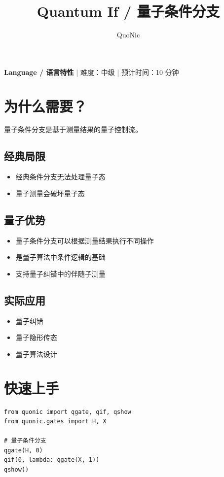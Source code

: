 \documentclass[12pt,a4paper]{article}
\title{Quantum If / 量子条件分支}
\author{QuoNic}
\date{}
\begin{document}
\maketitle

\begin{center}
\textbf{Language / 语言特性} | 难度：中级 | 预计时间：10 分钟
\end{center}

\tableofcontents
\newpage

\section{为什么需要？}

量子条件分支是基于测量结果的量子控制流。

\subsection{经典局限}
\begin{itemize}
  \item 经典条件分支无法处理量子态
  \item 量子测量会破坏量子态
\end{itemize}

\subsection{量子优势}
\begin{itemize}
  \item 量子条件分支可以根据测量结果执行不同操作
  \item 是量子算法中条件逻辑的基础
  \item 支持量子纠错中的伴随子测量
\end{itemize}

\subsection{实际应用}
\begin{itemize}
  \item 量子纠错
  \item 量子隐形传态
  \item 量子算法设计
\end{itemize}

\section{快速上手}

\begin{verbatim}
from quonic import qgate, qif, qshow
from quonic.gates import H, X

# 量子条件分支
qgate(H, 0)
qif(0, lambda: qgate(X, 1))
qshow()
\end{verbatim}
\end{document}
